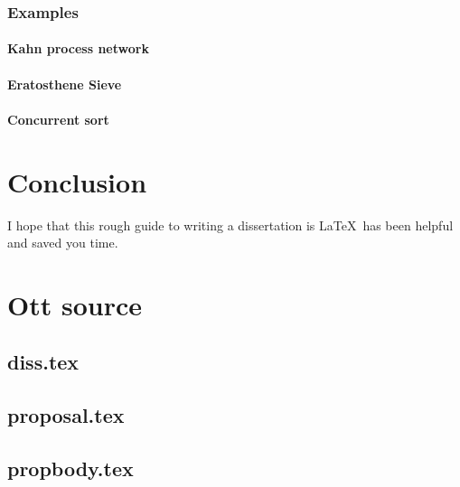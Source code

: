 \documentclass[12pt,twoside,notitlepage]{report}
\begin{document}
\subsection{Examples}
\subsubsection{Kahn process network}
\subsubsection{Eratosthene Sieve}
\subsubsection{Concurrent sort}
%

\cleardoublepage
\chapter{Conclusion}

I hope that this rough guide to writing a dissertation is \LaTeX\ has
been helpful and saved you time.




\cleardoublepage



\cleardoublepage

\appendix

\chapter{Ott source}

\section{diss.tex}
{\scriptsize}

\section{proposal.tex}
{\scriptsize}

\section{propbody.tex}
{\scriptsize}
\end{document}
